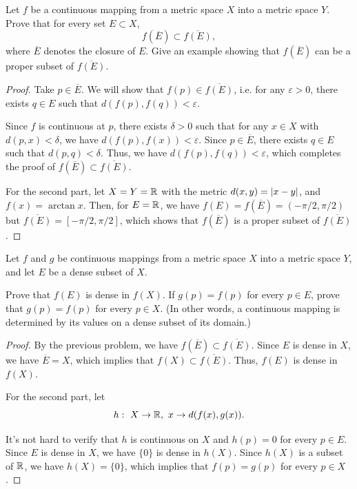 \documentclass{article}
\begin{document}
\begin{problem}[4-2]
Let $f$ be a continuous mapping from a metric space $X$ into a metric space $Y$. Prove that for every set $E\subset X$,
\[
f(\overline{E})\subset \overline{f(E)},
\]
where $\overline{E}$ denotes the closure of $E$. Give an example showing that $f(\overline{E})$ can be a proper subset of $\overline{f(E)}$.
\end{problem}

\begin{proof}
  Take \( p\in\overline{E} \). We will show that \( f(p)\in\overline{f(E)} \), i.e. for any \( \varepsilon>0 \), there exists \( q\in E \) such that \( d(f(p),f(q))<\varepsilon \).\par
  Since \( f \) is continuous at \( p \), there exists \( \delta>0 \) such that for any \( x\in X \) with \( d(p,x)<\delta \), we have \( d(f(p),f(x))<\varepsilon \). Since \( p\in\overline{E} \), there exists \( q\in E \) such that \( d(p,q)<\delta \). Thus, we have \( d(f(p),f(q))<\varepsilon \), which completes the proof of \( f(\overline{E})\subset \overline{f(E)} \).\par
  For the second part, let \( X=Y=\mathbb{R} \) with the metric \( d(x,y)=\left|x-y\right| \), and \( f(x)=\arctan x \). Then, for \( E=\mathbb{R} \), we have \( f(E)=f(\overline{E})=(-\pi/2,\pi/2) \) but \( \overline{f(E)}=[-\pi/2,\pi/2] \), which shows that \( f(\overline{E}) \) is a proper subset of \( \overline{f(E)} \).
\end{proof}



\begin{problem}[4-4]
Let $f$ and $g$ be continuous mappings from a metric space $X$ into a metric space $Y$, and let $E$ be a dense subset of $X$.

Prove that $f(E)$ is dense in $f(X)$. If $g(p)=f(p)$ for every $p\in E$, prove that $g(p)=f(p)$ for every $p\in X$. (In other words, a continuous mapping is determined by its values on a dense subset of its domain.)
\end{problem}

\begin{proof}
  By the previous problem, we have \( f(\overline{E})\subset \overline{f(E)} \). Since \( E \) is dense in \( X \), we have \( \overline{E}=X \), which implies that \( f(X)\subset \overline{f(E)} \). Thus, \( f(E) \) is dense in \( f(X) \).\par
  For the second part, let 
  \[ h:\ X\to\R,\ x\to d(f(x),g(x)). \]\par
  It's not hard to verify that \( h \) is continuous on \( X \) and \( h(p)=0 \) for every \( p\in E \). Since \( E \) is dense in \( X \), we have \( \{0\} \) is dense in \( h(X) \). Since \( h(X) \) is a subset of \( \mathbb{R} \), we have \( h(X)=\{0\} \), which implies that \( f(p)=g(p) \) for every \( p\in X \).
\end{proof}
\end{document}
